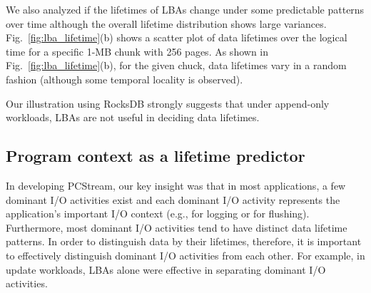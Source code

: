We also analyzed 
if the lifetimes of LBAs change under some predictable patterns over time 
although the overall lifetime distribution shows large variances.
Fig.~\ref{fig:lba_lifetime}(b) shows a scatter plot of data lifetimes over the logical time 
for a specific 1-MB chunk with 256 pages. 
As shown in Fig.~\ref{fig:lba_lifetime}(b), 
for the given chuck, data lifetimes vary in a random fashion
(although some temporal locality is observed).

Our illustration using RocksDB strongly suggests that under append-only
workloads, LBAs are not useful in deciding data lifetimes.

\subsection{Program context as a lifetime predictor}
In developing \textsf{\small PCStream}, our key insight was that in most applications,
a few dominant I/O activities exist
and each dominant I/O activity   
represents the application's important I/O context (e.g., for logging or for flushing). 
Furthermore, most dominant I/O activities tend to have distinct data lifetime patterns.
In order to distinguish data by their lifetimes, therefore, 
it is important to effectively distinguish dominant I/O activities from each other.  
For example, in update workloads, 
LBAs alone were effective in separating dominant I/O activities.  

